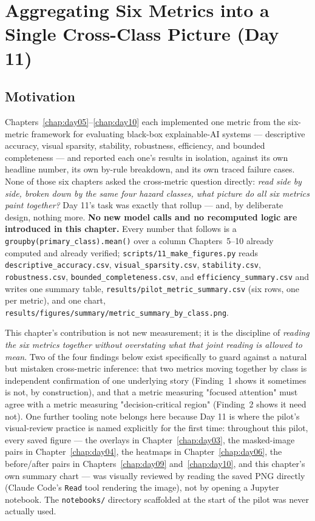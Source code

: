 \chapter{Aggregating Six Metrics into a Single Cross-Class Picture (Day 11)}
\label{chap:day11}

\section{Motivation}

Chapters~\ref{chap:day05}--\ref{chap:day10} each implemented one metric from the six-metric
framework for evaluating black-box explainable-AI systems \citep{arreche2024exai} ---
descriptive accuracy, visual sparsity, stability, robustness, efficiency, and bounded
completeness --- and reported each one's results in isolation, against its own headline number,
its own by-rule breakdown, and its own traced failure cases. None of those six chapters asked
the cross-metric question directly: \emph{read side by side, broken down by the same four
hazard classes, what picture do all six metrics paint together?} Day 11's task was exactly that
rollup --- and, by deliberate design, nothing more. \textbf{No new model calls and no
recomputed logic are introduced in this chapter.} Every number that follows is a
\texttt{groupby(primary\_class).mean()} over a column Chapters~5--10 already computed and
already verified; \texttt{scripts/11\_make\_figures.py} reads
\texttt{descriptive\_accuracy.csv}, \texttt{visual\_sparsity.csv}, \texttt{stability.csv},
\texttt{robustness.csv}, \texttt{bounded\_completeness.csv}, and \texttt{efficiency\_summary.csv}
and writes one summary table, \texttt{results/pilot\_metric\_summary.csv} (six rows, one per
metric), and one chart, \texttt{results/figures/summary/metric\_summary\_by\_class.png}.

This chapter's contribution is not new measurement; it is the discipline of \emph{reading the
six metrics together without overstating what that joint reading is allowed to mean}. Two of
the four findings below exist specifically to guard against a natural but mistaken
cross-metric inference: that two metrics moving together by class is independent confirmation
of one underlying story (Finding~1 shows it sometimes is not, by construction), and that a
metric measuring "focused attention" must agree with a metric measuring "decision-critical
region" (Finding~2 shows it need not). One further tooling note belongs here because Day 11 is
where the pilot's visual-review practice is named explicitly for the first time: throughout
this pilot, every saved figure --- the overlays in Chapter~\ref{chap:day03}, the masked-image
pairs in Chapter~\ref{chap:day04}, the heatmaps in Chapter~\ref{chap:day06}, the before/after
pairs in Chapters~\ref{chap:day09} and~\ref{chap:day10}, and this chapter's own summary chart
--- was visually reviewed by reading the saved PNG directly (Claude Code's \texttt{Read} tool
rendering the image), not by opening a Jupyter notebook. The \texttt{notebooks/} directory
scaffolded at the start of the pilot was never actually used.

